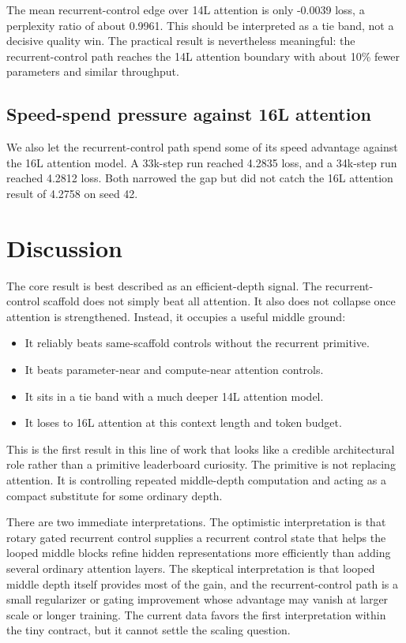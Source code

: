 \documentclass[11pt]{article}
\newcommand{\primitivecontrol}{rotary gated recurrent control}
\begin{document}
The mean recurrent-control edge over 14L attention is only -0.0039 loss, a
perplexity ratio of about 0.9961. This should be interpreted as a tie band, not
a decisive quality win. The practical result is nevertheless meaningful:
the recurrent-control path reaches the 14L attention boundary with about 10\% fewer
parameters and similar throughput.

\subsection{Speed-spend pressure against 16L attention}

We also let the recurrent-control path spend some of its speed advantage against the 16L
attention model. A 33k-step run reached 4.2835 loss, and a 34k-step run reached
4.2812 loss. Both narrowed the gap but did not catch the 16L attention result
of 4.2758 on seed 42.

\section{Discussion}

The core result is best described as an efficient-depth signal. The
recurrent-control scaffold does not simply beat all attention. It also does not
collapse once attention is strengthened. Instead, it occupies a useful middle
ground:

\begin{itemize}
  \item It reliably beats same-scaffold controls without the recurrent
    primitive.
  \item It beats parameter-near and compute-near attention controls.
  \item It sits in a tie band with a much deeper 14L attention model.
  \item It loses to 16L attention at this context length and token budget.
\end{itemize}

This is the first result in this line of work that looks like a credible
architectural role rather than a primitive leaderboard curiosity. The primitive
is not replacing attention. It is controlling repeated middle-depth computation
and acting as a compact substitute for some ordinary depth.

There are two immediate interpretations. The optimistic interpretation is that
\primitivecontrol{} supplies a recurrent control state that helps the looped middle
blocks refine hidden representations more efficiently than adding several
ordinary attention layers. The skeptical interpretation is that looped middle
depth itself provides most of the gain, and the recurrent-control path is a small regularizer
or gating improvement whose advantage may vanish at larger scale or longer
training. The current data favors the first interpretation within the tiny
contract, but it cannot settle the scaling question.
\end{document}
